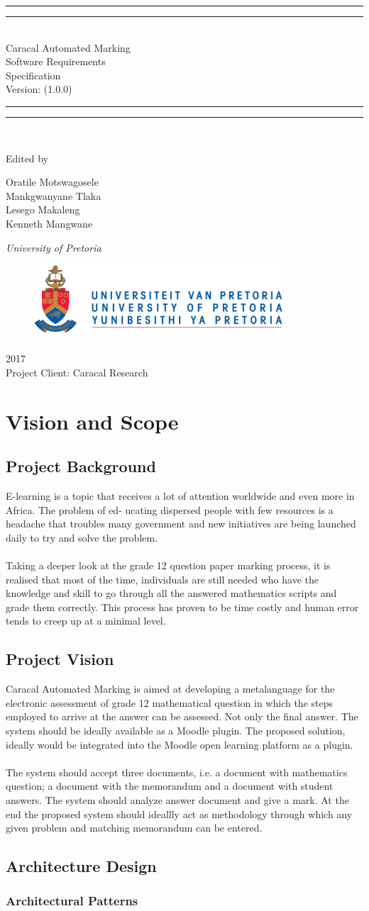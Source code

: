 \documentclass{article}
\newcommand*{\titleGP}{\begingroup %
\centering %
\vspace*{\baselineskip} %

\rule{\textwidth}{1.6pt}\vspace*{-\baselineskip}\vspace*{2pt} %
\rule{\textwidth}{0.4pt}\\[\baselineskip] %

{\LARGE Caracal Automated Marking \\ Software Requirements \\ Specification}\\[0.2\baselineskip]  %

Version: (1.0.0) 


\rule{\textwidth}{0.4pt}\vspace*{-\baselineskip}\vspace{3.2pt} %
\rule{\textwidth}{1.6pt}\\[\baselineskip] %

\scshape %
\vspace*{2\baselineskip} %

Edited by \\[\baselineskip]
{\Large Oratile Motswagosele \\ Mankgwanyane Tlaka \\ Lesego Makaleng \\ Kenneth Mangwane \par} %

{\itshape University of Pretoria\par} %

\begin{figure}[t]
\centering
	\includegraphics[width=350px]{Images/UP_Logo}
\end{figure}

{\scshape 2017} \\[0.3\baselineskip] %
{ Project Client: Caracal Research}\par %

\endgroup}
\begin{document}
\titleGP %
\pagebreak

\clearpage
\tableofcontents
\clearpage

\section{Vision and Scope}
	\subsection{Project Background}
	E-learning is a topic that receives a lot of attention worldwide and even more in Africa. The problem of ed-
ucating dispersed people with few resources is a headache that troubles many government and new initiatives
are being launched daily to try and solve the problem. \\\\
Taking a deeper look at the grade 12 question paper marking process, it is realised that most of the time,
individuals are still needed who have the knowledge and skill to go through all the answered mathematics scripts
and grade them correctly. This process has proven to be time costly and human error tends to creep up at a
minimal level.

	\subsection{Project Vision}
	Caracal Automated Marking is aimed at developing a metalanguage for the electronic assessment of grade 12
mathematical question in which the steps employed to arrive at the answer can be assessed. Not only the final answer.
The system should be ideally available as a Moodle plugin. The proposed solution, 
ideally would be integrated into the Moodle open learning platform as a plugin. \\\\
The system should accept three documents, i.e. a document with mathematics question; a document with the
memorandum and a document with student answers. The system should analyze answer document and give a
mark.
At the end the proposed system should ideallly act as methodology through which any given problem and
matching memorandum can be entered.

	\subsection{Architecture Design}
		\subsubsection{Architectural Patterns}
\end{document}
